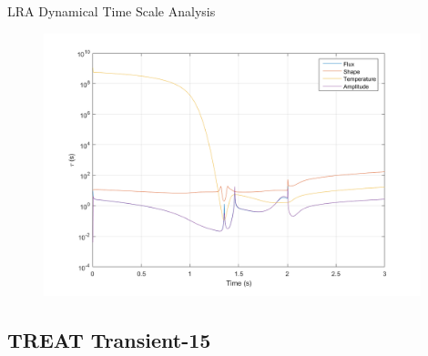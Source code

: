 \documentclass[8pt,xcolor=dvipnames]{beamer}
\begin{document}
\begin{frame}{LRA Dynamical Time Scale Analysis}

\begin{figure}
\includegraphics[width=\linewidth,height=3in,keepaspectratio]{figures/time_constant_lra.png}
\end{figure}

\end{frame}

\subsection{TREAT Transient-15}
\end{document}
